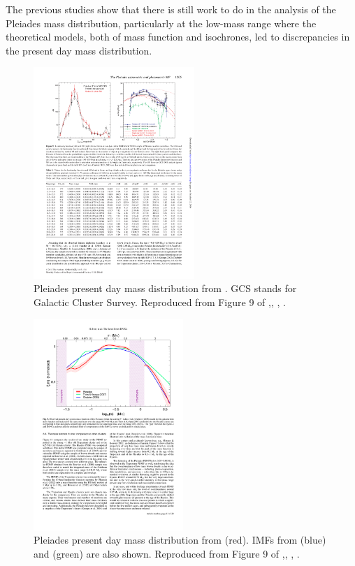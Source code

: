 The previous studies show that there is still work to do in the analysis of the Pleiades mass distribution, particularly at the low-mass range where the theoretical models, both of mass function and isochrones, led to discrepancies in the present day mass distribution.  

\begin{figure}[ht!]
\begin{center}
\includegraphics[height=8cm]{background/Figures/F9b_Lodieu2012.pdf}
\caption{Pleiades present day mass distribution from \citet{Lodieu2012}. GCS stands for Galactic Cluster Survey. Reproduced from Figure 9 of \citet{Lodieu2012},\textit{}, , .}
\label{fig:massLodieu}
\end{center}
\end{figure}

\begin{figure}[ht!]
\begin{center}
\includegraphics[height=8cm]{background/Figures/F9_Bouy2015.pdf}
\caption{Pleiades present day mass distribution  from \citet{Bouy2015} (red). IMFs from \citet{Chabrier2005}(blue) and \citet{Thies2007} (green) are also shown. Reproduced from Figure 9 of \citet{Bouy2015},\textit{}, , .}
\label{fig:massBouy}
\end{center}
\end{figure}


